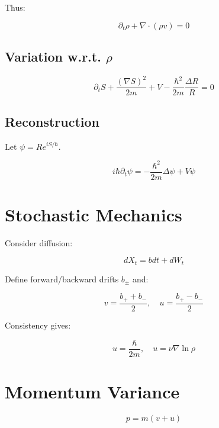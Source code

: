 \documentclass[11pt]{article}
\begin{document}
Thus:

\begin{equation}
\partial_t \rho + \nabla\cdot(\rho v)=0
\end{equation}

\subsection{Variation w.r.t. $\rho$}

\begin{equation}
\partial_t S + \frac{(\nabla S)^2}{2m} + V - \frac{\hbar^2}{2m}\frac{\Delta R}{R}=0
\end{equation}

\subsection{Reconstruction}

Let $\psi=Re^{iS/\hbar}$.

\begin{equation}
i\hbar \partial_t \psi = -\frac{\hbar^2}{2m}\Delta \psi + V\psi
\end{equation}

\section{Stochastic Mechanics}

Consider diffusion:

\begin{equation}
dX_t = b dt + dW_t
\end{equation}

Define forward/backward drifts $b_\pm$ and:

\begin{equation}
v = \frac{b_+ + b_-}{2}, \quad u = \frac{b_+ - b_-}{2}
\end{equation}

Consistency gives:

\begin{equation}
u = \frac{\hbar}{2m}, \quad u = \nu \nabla \ln \rho
\end{equation}

\section{Momentum Variance}

\begin{equation}
p = m(v+u)
\end{equation}
\end{document}
